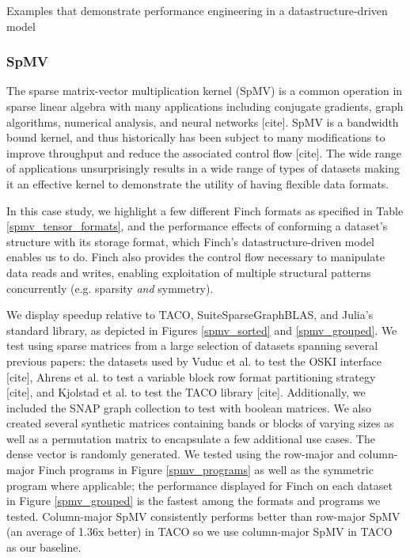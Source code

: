 Examples that demonstrate performance engineering in a datastructure-driven model

\subsubsection{SpMV}
The sparse matrix-vector multiplication kernel (SpMV) is a common operation in sparse linear algebra with many applications including conjugate gradients, graph algorithms, numerical analysis, and neural networks [cite]. SpMV is a bandwidth bound kernel, and thus historically has been subject to many modifications to improve throughput and reduce the associated control flow [cite]. The wide range of applications unsurprisingly results in a wide range of types of datasets making it an effective kernel to demonstrate the utility of having flexible data formats. 

In this case study, we highlight a few different Finch formats as specified in Table \ref{spmv_tensor_formats}, and the performance effects of conforming a dataset’s structure with its storage format, which Finch's datastructure-driven model enables us to do. Finch also provides the control flow necessary to manipulate data reads and writes, enabling exploitation of multiple structural patterns concurrently (e.g. sparsity \textit{and} symmetry). 


We display speedup relative to TACO, SuiteSparseGraphBLAS, and Julia’s standard library, as depicted in Figures \ref{spmv_sorted} and \ref{spmv_grouped}.  We test using sparse matrices from a large selection of datasets spanning several previous papers: the datasets used by Vuduc et al. to test the OSKI interface [cite], Ahrens et al. to test a variable block row format partitioning strategy [cite], and Kjolstad et al. to test the TACO library [cite]. Additionally, we included the SNAP graph collection to test with boolean matrices. We also created several synthetic matrices containing bands or blocks of varying sizes as well as a permutation matrix to encapsulate a few additional use cases. The dense vector is randomly generated. We tested using the row-major and column-major Finch programs in Figure \ref{spmv_programs} as well as the symmetric program where applicable; the performance displayed for Finch on each dataset in Figure \ref{spmv_grouped} is the fastest among the formats and programs we tested. Column-major SpMV consistently performs better than row-major SpMV (an average of 1.36x better) in TACO so we use column-major SpMV in TACO as our baseline.

